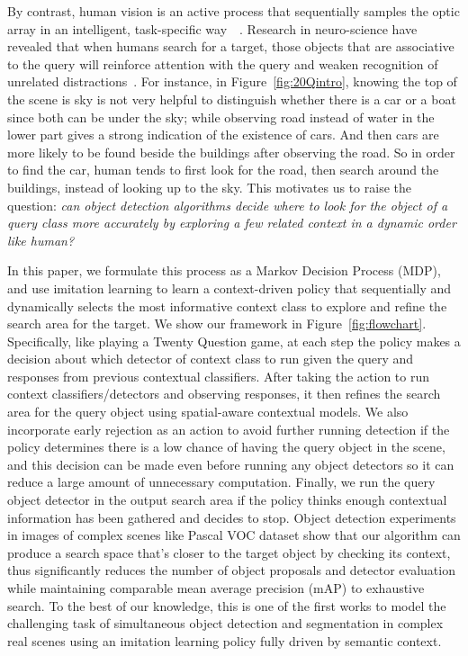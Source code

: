 By contrast, human vision is an active process that sequentially samples the optic array in an intelligent, task-specific way~\cite{najemnik2005optimal}~. Research in neuro-science have revealed that when humans search for a target, those objects that are associative to the query will reinforce attention with the query and weaken recognition of unrelated distractions~\cite{moores2003associative}. 
For instance, in Figure~\ref{fig:20Qintro}, knowing the top of the scene is sky is not very helpful to distinguish whether there is a car or a boat since both can be under the sky; 
while observing road instead of water in the lower part gives a strong indication of the existence of cars. And then cars are more likely to be found beside the buildings after observing the road. So in order to find the car, human tends to first look for the road, then search around the buildings, instead of looking up to the sky. %
This motivates us to raise the question: \textit{can object detection algorithms decide where to look for the object of a query class more accurately by exploring a few related context in a dynamic order like human?}

In this paper, we formulate this process as a Markov Decision Process (MDP), and use imitation learning to learn a context-driven policy that sequentially and dynamically selects the most informative context class to explore and refine the search area for the target. We show our framework in Figure~\ref{fig:flowchart}.  Specifically, like playing a Twenty Question game, at each step the policy makes a decision about which detector of context class to run given the query and responses from previous contextual classifiers. After taking the action to run context classifiers/detectors and observing responses, it then refines the search area for the query object using spatial-aware contextual models. We also incorporate early rejection as an action to avoid further running detection if the policy determines there is a low chance of having the query object in the scene, and this decision can be made even before running any object detectors so it can reduce a large amount of unnecessary computation. Finally, we run the query object detector in the output search area if the policy thinks enough contextual information has been gathered and decides to stop. Object detection experiments in images of complex scenes like Pascal VOC dataset show that our algorithm can produce a search space that's closer to the target object by checking its context, thus significantly reduces the number of object proposals and detector evaluation while maintaining comparable mean average precision (mAP) to exhaustive search. To the best of our knowledge, this is one of the first works to model the challenging task of simultaneous object detection and segmentation in complex real scenes using an imitation learning policy fully driven by semantic context.

